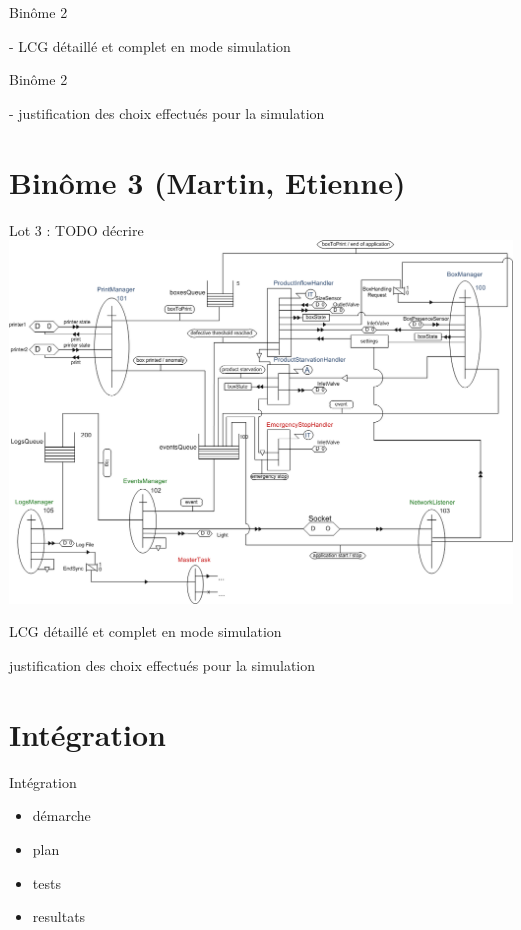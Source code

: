 \documentclass{beamer}
\begin{document}
	\begin{frame}

	Binôme 2

	- LCG détaillé et complet en mode simulation

	\end{frame}

	

	\begin{frame}

	Binôme 2

	- justification des choix effectués pour la simulation  

	\end{frame}

\section{Binôme 3 (Martin, Etienne)}
	\begin{frame}
	\begin{center}
		\huge Lot 3 : TODO décrire
		\includegraphics[height=0.8\textheight]{../../SchemasLCG/schemaGlobal.png}
	\end{center}
	\end{frame}

	\begin{frame}
		LCG détaillé et complet en mode simulation
	\end{frame}

	\begin{frame}
		justification des choix effectués pour la simulation 
	\end{frame}

\section{Intégration}
	\begin{frame}
		Intégration
		\begin{itemize}
			\item démarche
			\item plan
			\item tests
			\item resultats
		\end{itemize}
	\end{frame}
\end{document}
